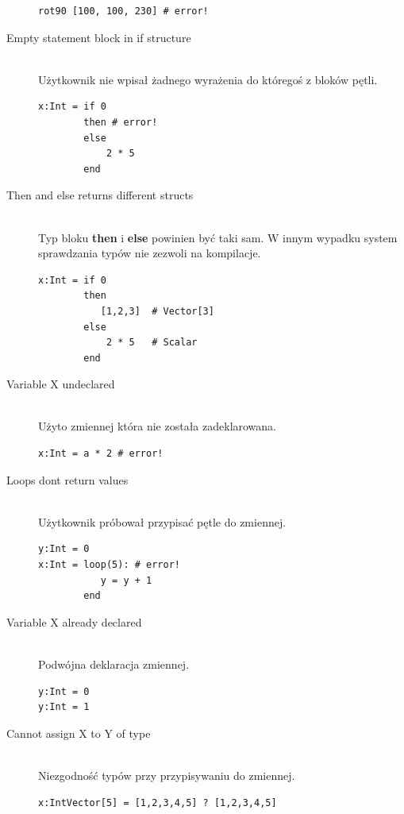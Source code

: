 \begin{description}
\begin{lstlisting}[frame=single]
rot90 [100, 100, 230] # error!
\end{lstlisting}       
  \item[Empty statement block in if structure] \hfill \\
      Użytkownik nie wpisał żadnego wyrażenia do któregoś z bloków pętli.
\begin{lstlisting}[frame=single]
x:Int = if 0
        then # error!
        else
            2 * 5
        end
\end{lstlisting}        
  \item[Then and else returns different structs] \hfill \\
       Typ bloku \textbf{then} i \textbf{else} powinien być taki sam. W innym wypadku system sprawdzania typów nie zezwoli na kompilacje.
\begin{lstlisting}[frame=single]
x:Int = if 0
        then 
           [1,2,3]  # Vector[3]
        else
            2 * 5   # Scalar
        end
\end{lstlisting}   
  \item[Variable X undeclared] \hfill \\
      Użyto zmiennej która nie została zadeklarowana.
\begin{lstlisting}[frame=single]
x:Int = a * 2 # error!
\end{lstlisting}   
  \item[Loops dont return values] \hfill \\
     Użytkownik próbował przypisać pętle do zmiennej.
\begin{lstlisting}[frame=single]
y:Int = 0
x:Int = loop(5): # error!
           y = y + 1
        end  
\end{lstlisting} 
  \item[Variable X already declared] \hfill \\
      Podwójna deklaracja zmiennej.
      \begin{lstlisting}[frame=single]
y:Int = 0
y:Int = 1
\end{lstlisting} 
  \item[Cannot assign X to Y of type]\hfill \\
  Niezgodność typów przy przypisywaniu do zmiennej.
  \begin{lstlisting}[frame=single]
x:IntVector[5] = [1,2,3,4,5] ? [1,2,3,4,5]
\end{lstlisting} 
\end{description}

